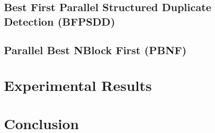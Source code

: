 \documentclass{article}
\begin{document}
\subsection{Best First Parallel Structured Duplicate Detection (BFPSDD)}
\subsection{Parallel Best NBlock First (PBNF)}
\section{Experimental Results}
\section{Conclusion}



\end{document}
